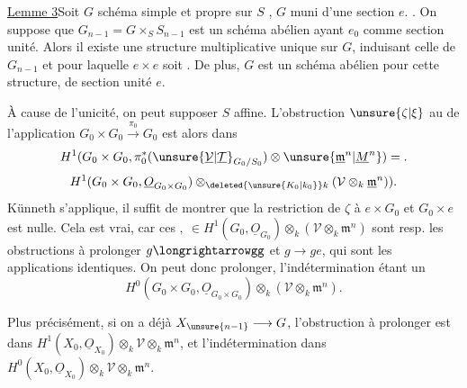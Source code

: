 \uline{Lemme 3}\quad Soit $G$ schéma simple et propre sur $S$  , $G$ muni d'une section $e$.  . On suppose que $G_{n-1}=G\times_S S_{n-1}$ est un schéma abélien ayant $e_0$ comme section unité.  Alors il existe une structure multiplicative unique sur $G$, induisant celle de $G_{n-1}$ et pour laquelle $e\times e$ soit . De plus, $G$ est un schéma abélien pour cette structure, de section unité $e$.

 À cause de l'unicité, on peut supposer $S$  affine. L'obstruction $\unsure{\zeta|\xi}$ au  de l'application $G_0\times G_0\xrightarrow{\pi_0}G_0$ est alors dans
\[
 H^1(G_0\times G_0,\pi_0^*(\unsure{\underline{\mathcal V}|\underline{\mathcal T}}_{G_0/S_0})\otimes\unsure{\underline{\mathfrak m}^{n}|\underline{M}^{n}})=.
\]
\[
H^1(G_0\times G_0,\underline O_{G_0\times G_0})\otimes_{\deleted{\unsure{K_0|k_0}}k}(\mathcal V\otimes_k\underline{\mathfrak m}^{n})).
\]
Künneth s'applique, il suffit de montrer que la restriction de $\zeta$ à $e\times G_0$ et $G_0\times e$ est nulle. Cela est vrai, car ces  $,\ \in H^1(G_0,\underline O_{G_0})\otimes_k(\mathcal V\otimes_k\mathfrak m^n)$ sont resp. les obstructions à prolonger $g\longrightarrowgg$ et $g\longrightarrow ge$, qui sont les applications identiques. On peut donc prolonger, l'indétermination étant un
\[
H^0(G_0\times G_0,\underline O_{G_0\times G_0})\otimes_k(\mathcal V\otimes_k\mathfrak m^n).
\]

 Plus précisément, si on a déjà $X_{\unsure{n-1}}\longrightarrow G$, l'obstruction à prolonger est dans $H^1(X_0,\underline O_{X_0})\otimes_k\mathcal V\otimes_k\mathfrak m^n$, et l'indétermination dans $H^0(X_0,\underline O_{X_0})\otimes_k\mathcal V\otimes_k\mathfrak m^n$.
